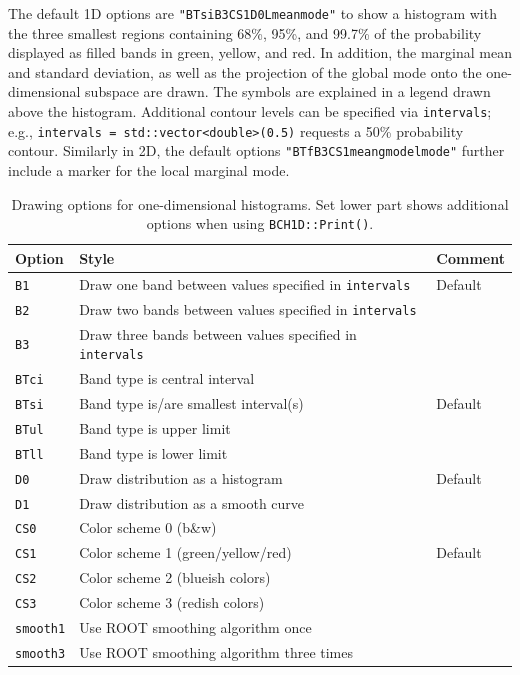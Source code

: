 \documentclass[11pt, a4paper]{article}
\begin{document}
The default 1D options are \texttt{"BTsiB3CS1D0Lmeanmode"} to show a
histogram with the three smallest regions containing 68\%, 95\%, and
99.7\% of the probability displayed as filled bands in green, yellow,
and red. In addition, the marginal mean and standard deviation, as
well as the projection of the global mode onto the one-dimensional
subspace are drawn. The symbols are explained in a legend drawn above
the histogram. Additional contour levels can be specified via
\texttt{intervals}; e.g., \verb|intervals = std::vector<double>(0.5)|
requests a 50\% probability contour. Similarly in 2D, the default
options \verb|"BTfB3CS1meangmodelmode"| further include a marker for
the local marginal mode.

\begin{table}[ht!]
\caption{Drawing options for one-dimensional histograms. Set lower
  part shows additional options when using \texttt{BCH1D::Print()}.
\label{table:draw1d}}
\begin{center}
\begin{tabular}{lll}
\toprule
Option & Style & Comment \\
\midrule
\verb|B1| & Draw one band between values specified in \verb|intervals| & Default  \\
\verb|B2| & Draw two bands between values specified in \verb|intervals| & \\
\verb|B3| & Draw three bands between values specified in \verb|intervals| & \\
\verb|BTci| & Band type is central interval & \\
\verb|BTsi| & Band type is/are smallest interval(s) & Default\\
\verb|BTul| & Band type is upper limit & \\
\verb|BTll| & Band type is lower limit & \\
\verb|D0| & Draw distribution as a histogram & Default \\
\verb|D1| & Draw distribution as a smooth curve & \\
\verb|CS0| & Color scheme 0 (b\&w) & \\
\verb|CS1| & Color scheme 1 (green/yellow/red) & Default  \\
\verb|CS2| & Color scheme 2 (blueish colors) &  \\
\verb|CS3| & Color scheme 3 (redish colors) & \\
\verb|smooth1| & Use ROOT smoothing algorithm once & \\
\verb|smooth3| & Use ROOT smoothing algorithm three times & \\

\end{tabular}
\end{center}
\end{table}
\end{document}
